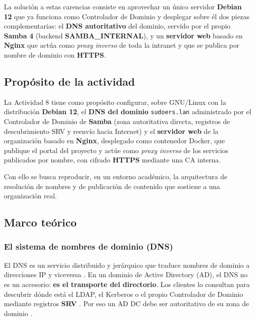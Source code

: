 La soluci\'on a estas carencias consiste en aprovechar un \'unico servidor
\textbf{Debian 12} que ya funciona como Controlador de Dominio y desplegar
sobre \'el dos piezas complementarias: el \textbf{DNS autoritativo} del
dominio, servido por el propio \textbf{Samba 4} (backend
\textbf{SAMBA\_INTERNAL}), y un \textbf{servidor web} basado en \textbf{Nginx}
que act\'ua como \textit{proxy inverso} de toda la intranet y que se publica
por nombre de dominio con \textbf{HTTPS}.

\subsection{Prop\'osito de la actividad}

La Actividad 8 tiene como prop\'osito configurar, sobre GNU/Linux con la
distribuci\'on \textbf{Debian 12}, el \textbf{DNS del dominio}
\texttt{sudoers.lan} administrado por el Controlador de Dominio de
\textbf{Samba} (zona autoritativa directa, registros de descubrimiento SRV y
reenv\'io hacia Internet) y el \textbf{servidor web} de la organizaci\'on
basado en \textbf{Nginx}, desplegado como contenedor Docker, que publique el
portal del proyecto y act\'ue como \textit{proxy inverso} de los servicios
publicados por nombre, con cifrado \textbf{HTTPS} mediante una CA interna.

Con ello se busca reproducir, en un entorno acad\'emico, la arquitectura de
resoluci\'on de nombres y de publicaci\'on de contenido que sostiene a una
organizaci\'on real.

\subsection{Marco te\'orico}

\subsubsection{El sistema de nombres de dominio (DNS)}

El DNS es un servicio distribuido y jer\'arquico que traduce nombres de
dominio a direcciones IP y viceversa \citep{rfc1034}. En un dominio de
Active Directory (AD), el DNS no es un accesorio: \textbf{es el transporte del
directorio}. Los clientes lo consultan para descubrir d\'onde est\'a el LDAP,
el Kerberos o el propio Controlador de Dominio mediante registros
\textbf{SRV} \citep{rfc2782}. Por eso un AD DC debe ser autoritativo de su
zona de dominio \citep{msft_activedirectory}.


